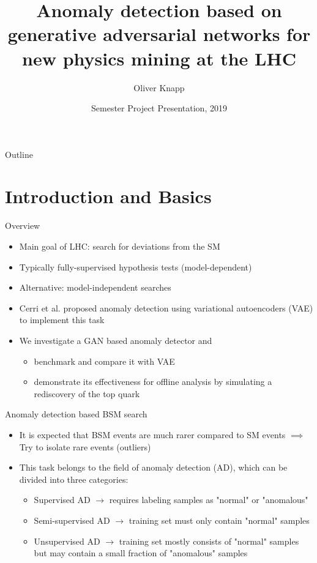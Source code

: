 \documentclass{beamer}
\title{Anomaly detection based on generative adversarial networks for new physics mining at the LHC}
\author{Oliver Knapp \inst{1}}
\institute[Swiss Federal Institute of Technology] %
{
  \inst{1}%
  Department of Physics \\
  Swiss Federal Institute of Technology
}
\date{Semester Project Presentation, 2019}
\newcommand{\cmark}{\ding{51}}%
\newcommand{\xmark}{\ding{55}}%
\begin{document}
\begin{frame}
  \titlepage
\end{frame}

\begin{frame}{Outline}
  \tableofcontents
\end{frame}

\section{Introduction and Basics}

\begin{frame}{Overview}
  \begin{itemize}
      \item Main goal of LHC: search for deviations from the SM \pause
      \item Typically fully-supervised hypothesis tests (model-dependent) \pause
      \item Alternative: model-independent searches \pause
      \item Cerri et al. proposed anomaly detection using variational autoencoders (VAE) to implement this task \pause
      \item We investigate a GAN based anomaly detector and
      \begin{itemize}
        \pause
        \item benchmark and compare it with VAE
        \pause
        \item demonstrate its effectiveness for offline analysis by simulating a rediscovery of the top quark
      \end{itemize}
  \end{itemize}
\end{frame}

\begin{frame}{Anomaly detection based BSM search}
  \begin{itemize}
      \item<1-> It is expected that BSM events are much rarer compared to SM events $\implies$ Try to isolate rare events (outliers)
      \item<2-> This task belongs to the field of anomaly detection (AD), which can be divided into three categories:
      \begin{itemize}
        \item<3-> Supervised AD $\rightarrow$ requires labeling samples as "normal" or "anomalous" \uncover<4->{\textcolor{red}{\xmark}}
        \item<5-> Semi-supervised AD $\rightarrow$ training set must only contain "normal" samples \uncover<6->{\textcolor{red}{\xmark}}
        \item<7-> Unsupervised AD $\rightarrow$ training set mostly consists of "normal" samples but may contain a small fraction of "anomalous" samples \uncover<8->{\textcolor{green}{\cmark}}
      \end{itemize}
  \end{itemize}
\end{frame}
\end{document}
